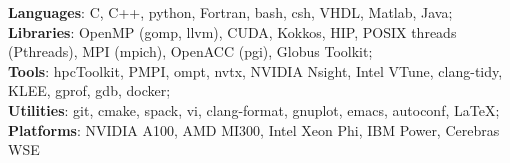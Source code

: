 {{\bf Languages}: C, C++, python, Fortran, bash, csh, VHDL, Matlab, Java};\\
{{\bf Libraries}:  OpenMP (gomp, llvm), CUDA, Kokkos, HIP, POSIX threads (Pthreads), MPI (mpich), OpenACC (pgi), Globus Toolkit}; \\
{{\bf Tools}: hpcToolkit, PMPI, ompt, nvtx, NVIDIA Nsight, Intel VTune, clang-tidy, KLEE,  gprof, gdb, docker}; \\
{{\bf Utilities}: git, cmake, spack, vi, clang-format, gnuplot, emacs, autoconf, LaTeX};\\
{{\bf Platforms}: {NVIDIA A100, AMD MI300, Intel Xeon Phi, IBM Power, Cerebras WSE}}

